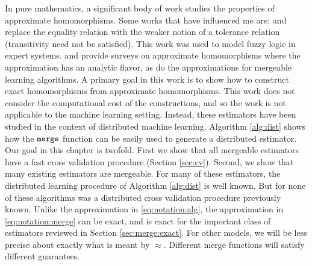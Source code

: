 \documentclass[thesis.tex]{subfiles}
\newcommand{\merge}{\mkprocedure{merge}}
\begin{document}
{    In pure mathematics, a significant body of work studies the properties of approximate homomorphisms.
    Some works that have influenced me are:
    \citet{zelinka1970tolerance} and \citet{zelinka1975tolerance} replace the equality relation with the weaker notion of a tolerance relation (transitivity need not be satisfied).
    This work was used to model fuzzy logic in expert systems. 
    \citet{kotschick2004quasi} and \citet{green2014approximate} provide surveys on approximate homomorphisms where the approximation has an analytic flavor, 
    as do the approximations for mergeable learning algorithms.
    A primary goal in this work is to show how to construct exact homomorphisms from approximate homomorphisms.
    This work does not consider the computational cost of the constructions,
    and so the work is not applicable to the machine learning setting. 
}
Instead, these estimators have been studied in the context of distributed machine learning.
Algorithm \ref{alg:dist} shows how the $\merge$ function can be easily used to generate a distributed estimator.
Our goal in this chapter is twofold.
First we show that all mergeable estimators have a fast cross validation procedure (Section \ref{sec:cv}).
Second, we show that many existing estimators are mergeable.
For many of these estimators, the distributed learning procedure of Algorithm \ref{alg:dist} is well known.
But for none of these algorithms was a distributed cross validation procedure previously known.
Unlike the approximation in \eqref{eq:notation:alg},
the approximation in \eqref{eq:notation:merge} can be exact,
and is exact for the important class of estimators reviewed in Section \ref{sec:merge:exact}.
For other models, we will be less precise about exactly what is meant by $\approx$.
Different merge functions will satisfy different guarantees.

\end{document}
